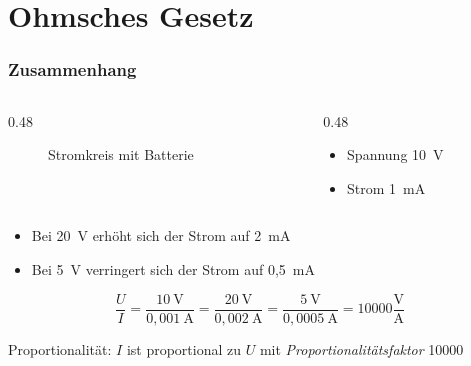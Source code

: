 
\section{Ohmsches Gesetz}
\label{section:ohmsches_gesetz}

\begin{frame}
\end{frame}

\begin{frame}
\frametitle{Zusammenhang}
\begin{columns}
    \begin{column}{0.48\textwidth}
    
\begin{figure}
    \caption{\scriptsize Stromkreis mit Batterie}
    \label{n_ohmsches_gesetz_stromkreis_mit_batterie}
\end{figure}


    \end{column}
   \begin{column}{0.48\textwidth}
       \begin{itemize}
  \item Spannung 10 V
  \item Strom 1 mA
  \end{itemize}

   \end{column}
\end{columns}

\end{frame}

\begin{frame}\begin{itemize}
  \item Bei 20 V erhöht sich der Strom auf 2 mA
  \item Bei 5 V verringert sich der Strom auf 0,5 mA
  \end{itemize}
    \pause
    $$\dfrac{U}{I} = \dfrac{10 \ \text{V}}{0,001 \ \text{A}} = \dfrac{20 \ \text{V}}{0,002 \ \text{A}} = \dfrac{5 \ \text{V}}{0,0005 \ \text{A}} = 10000 \frac{\text{V}}{\text{A}}$$

    \pause
    Proportionalität: $I$ ist proportional zu $U$ mit \emph{Proportionalitätsfaktor} 10000
\end{frame}

